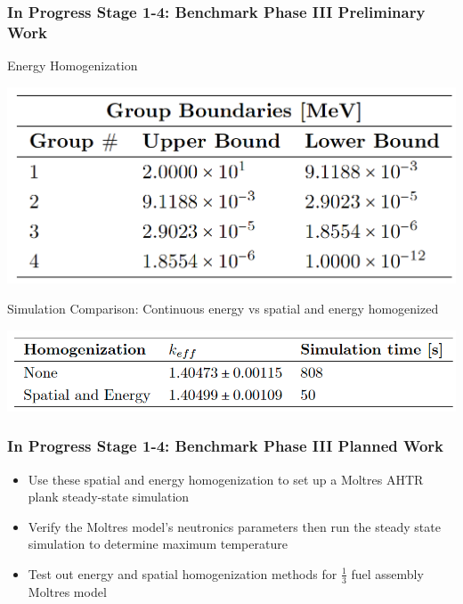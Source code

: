 \begin{frame}
    \frametitle{In Progress Stage 1-4: Benchmark Phase III Preliminary Work}
    \begin{block}{Energy Homogenization}
        \begin{table}[]
            \centering
            \begin{minipage}[c]{0.6\textwidth}
                \centering
                \includegraphics[width=0.9\linewidth]{figures/ahtr-energy-discr.png}
            \end{minipage}\hfill
            \begin{minipage}[c]{0.4\textwidth}
            \caption{4-group energy structures for AHTR geometry 
            derived by \cite{gentry_development_2016}.}
        \end{minipage}
        \end{table}
    \end{block}
    \vspace{-0.3cm}
    \begin{block}{Simulation Comparison: Continuous energy vs spatial 
        and energy homogenized}
        \begin{table}[]
                \centering
                \includegraphics[width=0.7\linewidth]{figures/ahtr-homogenization.png}
            \caption{
                AHTR fuel slab's $k_{eff}$ for case with continuous energy and 
                space and case with spatial and energy homogenization.}
        \end{table}
    \end{block}
\end{frame}

\begin{frame}
    \frametitle{In Progress Stage 1-4: Benchmark Phase III Planned Work}
    \begin{itemize}
        \item Use these spatial and energy homogenization to set up a 
        Moltres AHTR plank steady-state simulation 
        \item Verify the Moltres model's neutronics parameters then run 
        the steady state simulation to determine maximum temperature 
        \item Test out energy and spatial homogenization methods for $\frac{1}{3}$
        fuel assembly Moltres model 
    \end{itemize}
\end{frame}